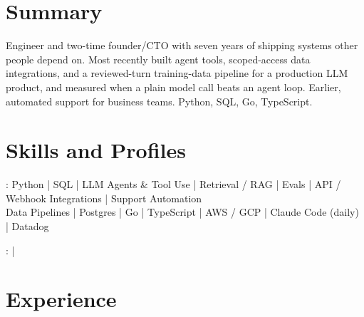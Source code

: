 \documentclass[print]{jack-resume}
\begin{document}
\pagecolor{darkmodeBackground}


\begin{minipage}[t][1cm][t]{.03\textwidth}
    \hfill
\end{minipage}

\section{Summary}
Engineer and two-time founder/CTO with seven years of shipping systems other people depend on. Most recently built agent tools, scoped-access data integrations, and a reviewed-turn training-data pipeline for a production LLM product, and measured when a plain model call beats an agent loop. Earlier, automated support for business teams. Python, SQL, Go, TypeScript.
\sectionsep

\section{Skills and Profiles}
:
Python \hfill | \hfill
SQL \hfill | \hfill
LLM Agents \& Tool Use \hfill | \hfill
Retrieval / RAG \hfill | \hfill
Evals \hfill | \hfill
API / Webhook Integrations \hfill | \hfill
Support Automation \\
\hspace{1.0cm} Data Pipelines \hfill | \hfill
Postgres \hfill | \hfill
Go \hfill | \hfill
TypeScript \hfill | \hfill
AWS / GCP \hfill | \hfill
Claude Code (daily) \hfill | \hfill
Datadog \\

\raggedright{
    :
      \href{https://www.linkedin.com/in/jack-sturtevant/}{ \ExternalLink} |
     \href{https://github.com/jacksturt}{ \ExternalLink}}

\section{Experience}
\end{document}
